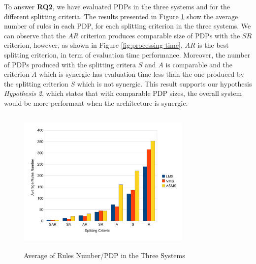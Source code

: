To answer \textbf{RQ2}, we have evaluated PDPs in the three systems and for the different splitting criteria. The results presented in Figure 
\ref{average} show the average number of rules in each PDP, for each splitting criterion in the three systems. We can observe that the $AR$ 
criterion produces comparable size of PDPs with the $SR$ criterion, however, as shown in Figure 
\ref{fig:processing time}, $AR$ is the best splitting criterion, in term of evaluation time performance. 
Moreover, the number of PDPs produced with the splitting critera $S$ and $A$ is comparable and the criterion 
$A$ which is synergic has evaluation time less than the one produced by the splitting criterion $S$ which is not synergic.
This result supports our hypothesis \textit{Hypothesis 2}, which states that with comparable PDP sizes, the overall system would 
be more performant when the architecture is synergic.

\begin{figure}[!h]
\centering
\includegraphics[width=8.5cm, height=7.2cm]{averagerules.pdf}
\begin{center}
\caption{Average of Rules Number/PDP in the Three Systems}
\label{average}
\end{center}
\end{figure}
